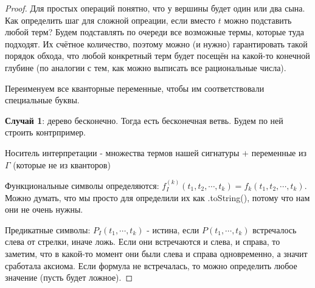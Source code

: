 \begin{proof}

    Для простых операций понятно, что у вершины будет один или два сына. Как определить шаг для сложной опреации, если 
    вместо $t$ можно подставить любой терм? Будем подставлять по очереди все возможные термы, которые туда подходят. 
    Их счётное количество, поэтому можно (и нужно) гарантировать такой порядок обхода, что любой конкретный терм будет посещён на какой-то конечной глубине 
    (по аналогии с тем, как можно выписать все рациональные числа).

    Переименуем все кванторные переменные, чтобы им соответствовали специальные буквы.

    \textbf{Случай 1}: дерево бесконечно. Тогда есть бесконечная ветвь. Будем по ней строить контрпример.

    Носитель интерпретации - множества термов нашей сигнатуры $+$ переменные из $\Gamma$ (которые не из кванторов)

    Функциональные символы определяются: $f^{(k)}_{I}(t_1, t_2, \cdots, t_k) = f_k(t_1, t_2, \cdots, t_k)$. Можно думать, 
    что мы просто для определили их как .toString(), потому что нам они не очень нужны.

    Предикатные символы: $P_I(t_1, \cdots, t_k)$ - истина, если $P(t_1, \cdots, t_k)$ встречалось слева от стрелки, иначе ложь.
    Если они встречаются и слева, и справа, то заметим, что в какой-то момент они были слева и справа одновременно, а значит сработала аксиома.
    Если формула не встречалась, то можно определить любое значение (пусть будет ложное).


\end{proof}

